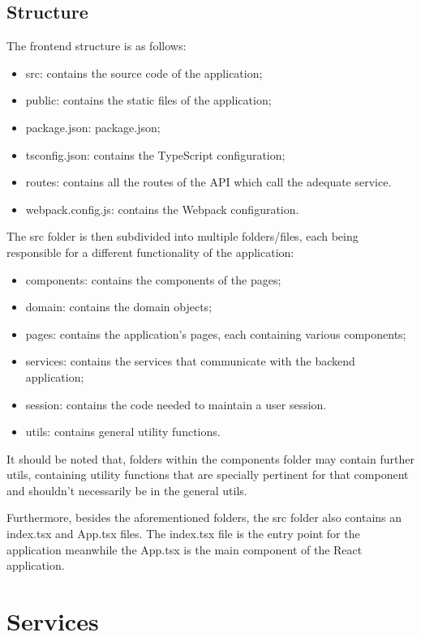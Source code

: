\subsection{Structure}

The frontend structure is as follows:

\begin{itemize}
	\item src: contains the source code of the application;
	\item public: contains the static files of the application;
	\item package.json:  package.json;
	\item tsconfig.json: contains the TypeScript configuration;
	\item routes: contains all the routes of the API which call the adequate service.
	\item webpack.config.js:  contains the Webpack configuration.
\end{itemize}

The src folder is then subdivided into multiple folders/files, each being responsible for a different functionality of the application:

\begin{itemize}
	\item components: contains the components of the pages;
	\item domain: contains the domain objects;
	\item pages:  contains the application's pages, each containing various components;
	\item services: contains the services that communicate with the backend application;
	\item session: contains the code needed to maintain a user session.
	\item utils:  contains general utility functions.
\end{itemize}

It should be noted that, folders within the components folder may contain further utils, containing utility functions that are specially pertinent for that component and shouldn't necessarily be in the general utils. 

Furthermore, besides the aforementioned folders, the src folder also contains an index.tsx and App.tsx files. The index.tsx file is the entry point for the application meanwhile the App.tsx is the main component of the React application.
\pagebreak

\section{Services}

